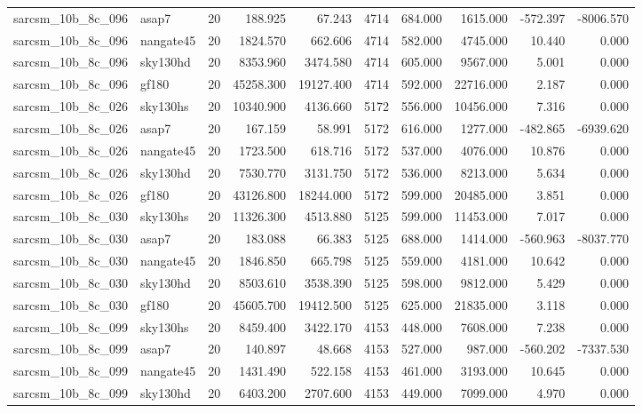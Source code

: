 \begin{tabular}{llrrrrrrrr}
sarcsm\_10b\_8c\_096 & asap7 & 20 & 188.925 & 67.243 & 4714 & 684.000 & 1615.000 & -572.397 & -8006.570 \\
sarcsm\_10b\_8c\_096 & nangate45 & 20 & 1824.570 & 662.606 & 4714 & 582.000 & 4745.000 & 10.440 & 0.000 \\
sarcsm\_10b\_8c\_096 & sky130hd & 20 & 8353.960 & 3474.580 & 4714 & 605.000 & 9567.000 & 5.001 & 0.000 \\
sarcsm\_10b\_8c\_096 & gf180 & 20 & 45258.300 & 19127.400 & 4714 & 592.000 & 22716.000 & 2.187 & 0.000 \\
sarcsm\_10b\_8c\_026 & sky130hs & 20 & 10340.900 & 4136.660 & 5172 & 556.000 & 10456.000 & 7.316 & 0.000 \\
sarcsm\_10b\_8c\_026 & asap7 & 20 & 167.159 & 58.991 & 5172 & 616.000 & 1277.000 & -482.865 & -6939.620 \\
sarcsm\_10b\_8c\_026 & nangate45 & 20 & 1723.500 & 618.716 & 5172 & 537.000 & 4076.000 & 10.876 & 0.000 \\
sarcsm\_10b\_8c\_026 & sky130hd & 20 & 7530.770 & 3131.750 & 5172 & 536.000 & 8213.000 & 5.634 & 0.000 \\
sarcsm\_10b\_8c\_026 & gf180 & 20 & 43126.800 & 18244.000 & 5172 & 599.000 & 20485.000 & 3.851 & 0.000 \\
sarcsm\_10b\_8c\_030 & sky130hs & 20 & 11326.300 & 4513.880 & 5125 & 599.000 & 11453.000 & 7.017 & 0.000 \\
sarcsm\_10b\_8c\_030 & asap7 & 20 & 183.088 & 66.383 & 5125 & 688.000 & 1414.000 & -560.963 & -8037.770 \\
sarcsm\_10b\_8c\_030 & nangate45 & 20 & 1846.850 & 665.798 & 5125 & 559.000 & 4181.000 & 10.642 & 0.000 \\
sarcsm\_10b\_8c\_030 & sky130hd & 20 & 8503.610 & 3538.390 & 5125 & 598.000 & 9812.000 & 5.429 & 0.000 \\
sarcsm\_10b\_8c\_030 & gf180 & 20 & 45605.700 & 19412.500 & 5125 & 625.000 & 21835.000 & 3.118 & 0.000 \\
sarcsm\_10b\_8c\_099 & sky130hs & 20 & 8459.400 & 3422.170 & 4153 & 448.000 & 7608.000 & 7.238 & 0.000 \\
sarcsm\_10b\_8c\_099 & asap7 & 20 & 140.897 & 48.668 & 4153 & 527.000 & 987.000 & -560.202 & -7337.530 \\
sarcsm\_10b\_8c\_099 & nangate45 & 20 & 1431.490 & 522.158 & 4153 & 461.000 & 3193.000 & 10.645 & 0.000 \\
sarcsm\_10b\_8c\_099 & sky130hd & 20 & 6403.200 & 2707.600 & 4153 & 449.000 & 7099.000 & 4.970 & 0.000 \\

\end{tabular}
